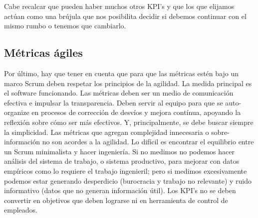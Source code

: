 Cabe recalcar que pueden haber muchos otros KPI's y que los que elijamos actúan como una brújula que nos posibilita decidir si debemos continuar con el mismo rumbo o tenemos que cambiarlo.

\subsection{Métricas ágiles}

Por último, hay que tener en cuenta que para que las métricas estén bajo un marco Scrum deben respetar los principios de la agilidad. La medida principal es el software funcionando. Las métricas deben ser un medio de comunicación efectiva e impulsar la transparencia. Deben servir al equipo para que se auto-organize en procesos de corrección de desvíos y mejora contínua, apoyando la reflexión sobre cómo ser más efectivos. Y, principalmente, se debe buscar siempre la simplicidad. Las métricas que agregan complejidad innecesaria o sobre-información no son acordes a la agilidad. Lo difícil es encontrar el equilibrio entre un Scrum minimalista y hacer ingeniería. Si no medimos no podemos hacer análisis del sistema de trabajo, o sistema productivo, para mejorar con datos empíricos como lo requiere el trabajo ingenieril; pero si medimos excesivamente podemos estar generando desperdicio (burocracia y trabajo no relevante) y ruido informativo (datos que no generan información útil). Los KPI's no se deben convertir en objetivos que deben lograrse ni en herramienta de control de empleados.
